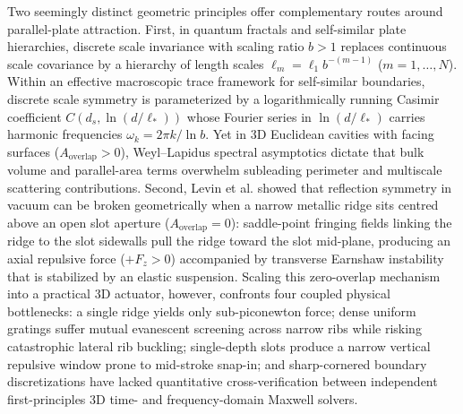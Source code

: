 \documentclass[pdflatex,sn-nature]{sn-jnl}
\begin{document}
Two seemingly distinct geometric principles offer complementary routes around parallel-plate attraction. First, in quantum fractals\cite{kempkes2019,xu2021} and self-similar plate hierarchies\cite{akkermans2010,shajesh2016,shajesh2017}, discrete scale invariance with scaling ratio $b>1$ replaces continuous scale covariance by a hierarchy of length scales $\ell_m = \ell_1 b^{-(m-1)}$ ($m=1,\dots,N$). Within an effective macroscopic trace framework for self-similar boundaries\cite{milton2004,milton2016,gordon2026prd}, discrete scale symmetry is parameterized by a logarithmically running Casimir coefficient $C(d_s,\ln(d/\ell_*))$ whose Fourier series in $\ln(d/\ell_*)$ carries harmonic frequencies $\omega_k = 2\pi k/\ln b$. Yet in 3D Euclidean cavities with facing surfaces ($A_{\mathrm{overlap}}>0$), Weyl--Lapidus spectral asymptotics\cite{lapidus1991} dictate that bulk volume and parallel-area terms overwhelm subleading perimeter and multiscale scattering contributions. Second, Levin et al.\cite{levin2010} showed that reflection symmetry in vacuum can be broken geometrically when a narrow metallic ridge sits centred above an open slot aperture ($A_{\mathrm{overlap}}=0$): saddle-point fringing fields linking the ridge to the slot sidewalls pull the ridge toward the slot mid-plane, producing an axial repulsive force ($+F_z>0$) accompanied by transverse Earnshaw instability that is stabilized by an elastic suspension\cite{levin2010,rodriguez2011}. Scaling this zero-overlap mechanism into a practical 3D actuator, however, confronts four coupled physical bottlenecks: a single ridge yields only sub-piconewton force; dense uniform gratings suffer mutual evanescent screening across narrow ribs while risking catastrophic lateral rib buckling; single-depth slots produce a narrow vertical repulsive window prone to mid-stroke snap-in; and sharp-cornered boundary discretizations have lacked quantitative cross-verification between independent first-principles 3D time- and frequency-domain Maxwell solvers.
\end{document}
